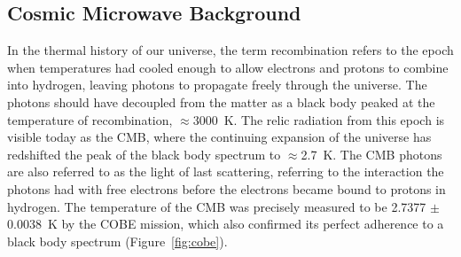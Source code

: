 \subsection{Cosmic Microwave Background}
\label{sec:cmb_dm}
In the thermal history of our universe, the term recombination refers to the epoch when temperatures had cooled enough to allow electrons and protons to combine into hydrogen, leaving photons to propagate freely through the universe. The photons should have decoupled from the matter as a black body peaked at the temperature of recombination,  $\approx$3000~K. The relic radiation from this epoch is visible today as the \ac{CMB}, where the continuing expansion of the universe has redshifted the peak of the black body spectrum to $\approx$2.7~K. The \ac{CMB} photons are also referred to as the light of last scattering, referring to the interaction the photons had with free electrons before the electrons became bound to protons in hydrogen. The temperature of the \ac{CMB} was precisely measured to be 2.7377 $\pm$ 0.0038~K  by the COBE mission, which also confirmed its perfect adherence to a black body spectrum \cite{Smoot1999} (Figure~\ref{fig:cobe}).

